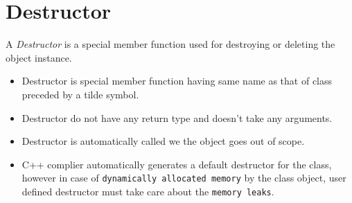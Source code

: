 \documentclass[oops.tex]{subfiles}
\begin{document}
\section{Destructor}

A \emph{Destructor} is a special member function used for destroying or
deleting the object instance.
\begin{itemize}
    \item Destructor is special member function having same name as that of 
          class preceded by a tilde symbol. 
    \item Destructor do not have any return type and doesn't take any arguments.
    \item Destructor is automatically called we the object goes out of scope.
    \item C++ complier automatically generates a default destructor for the 
          class, however in case of \texttt{dynamically allocated memory} by the 
          class object, user defined destructor must take care about the
          \texttt{memory leaks}.
\end{itemize}
\end{document}
